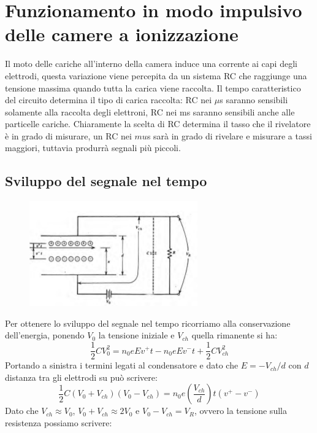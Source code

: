 \section{Funzionamento in modo impulsivo delle camere a ionizzazione}
Il moto delle cariche all'interno della camera induce una corrente ai capi degli elettrodi, questa variazione viene percepita
da un sistema RC che raggiunge una tensione massima quando tutta la carica viene raccolta.
Il tempo caratteristico del circuito determina il tipo di carica raccolta: RC nei $\mu$s saranno sensibili solamente alla raccolta degli elettroni,
RC nei ms saranno sensibili anche alle particelle cariche.
Chiaramente la scelta di RC determina il tasso che il rivelatore \`e in grado di misurare, un RC nei $mu$s sar\`a in grado di rivelare e misurare
a tassi maggiori, tuttavia produrr\`a segnali pi\`u piccoli.
\subsection{Sviluppo del segnale nel tempo}
\begin{figure}[htbp]
\begin{center}
	\includegraphics[scale=1]{./Immagini/CircuitoCameraIonizzazione.png}
\end{center}
\end{figure}
Per ottenere lo sviluppo del segnale nel tempo ricorriamo alla conservazione dell'energia, ponendo $V_0$ la tensione iniziale e $V_{ch}$ quella rimanente si ha:
\begin{equation*}
\frac{1}{2} C V_0^2 = n_0 e E v^+ t - n_0 e E v^- t + \frac{1}{2}C V_{ch}^2
\end{equation*}
Portando a sinistra i termini legati al condensatore e dato che $E=-V_{ch}/d$ con $d$ distanza tra gli elettrodi su pu\`o scrivere:
\begin{equation*}
\frac{1}{2} C (V_0+V_{ch})(V_0-V_{ch}) = n_0 e \left(\frac{V_{ch}}{d}\right) t (v^+ - v^-)
\end{equation*}
Dato che $V_{ch}\approx V_0$, $V_0+V_{ch}\approx 2 V_0$ e $V_0 - V_{ch} = V_R$, ovvero la tensione sulla resistenza possiamo scrivere:
